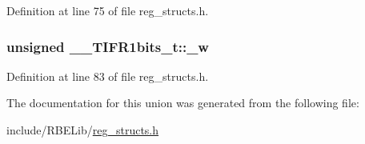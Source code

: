 Definition at line 75 of file reg\+\_\+structs.\+h.

\hypertarget{union_____t_i_f_r1bits__t_a3e0ab1c1af805293eee68527df229f38}{
\subsubsection[{\+\_\+w}]{\setlength{\rightskip}{0pt plus 5cm}unsigned \+\_\+\+\_\+\+T\+I\+F\+R1bits\+\_\+t\+::\+\_\+w}}\label{union_____t_i_f_r1bits__t_a3e0ab1c1af805293eee68527df229f38}


Definition at line 83 of file reg\+\_\+structs.\+h.



The documentation for this union was generated from the following file\+:\begin{DoxyCompactItemize}
\item 
include/\+R\+B\+E\+Lib/\hyperlink{reg__structs_8h}{reg\+\_\+structs.\+h}\end{DoxyCompactItemize}
